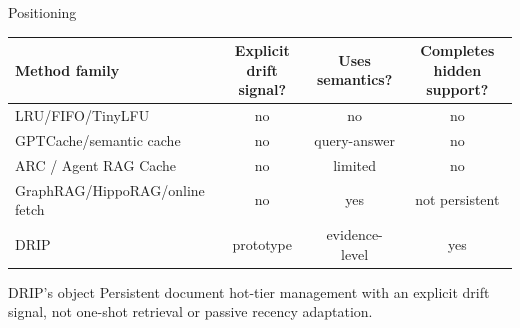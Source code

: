 \documentclass[aspectratio=169,10pt]{beamer}
\newcommand{\en}[1]{{\latinfont #1}}
\newcommand{\dive}{\en{DRIP}}
\newcommand{\arc}{\en{ARC}}
\newcommand{\lru}{\en{LRU}}
\newcommand{\fifo}{\en{FIFO}}
\newcommand{\gptc}{\en{GPTCache}}
\begin{document}
\begin{frame}{Positioning}
  \scriptsize
  \begin{table}
  \centering
  \setlength{\tabcolsep}{3pt}
  \begin{tabular}{p{}ccc}
    \toprule
    Method family & Explicit drift signal? & Uses semantics? & Completes hidden support? \\
    \midrule
    \lru{}/\fifo{}/\en{TinyLFU} & no & no & no \\
    \gptc{}/semantic cache & no & query-answer & no \\
    \arc{} / Agent RAG Cache & no & limited & no \\
    \en{GraphRAG}/\en{HippoRAG}/online fetch & no & yes & not persistent \\
    \dive{} & prototype & evidence-level & yes \\
    \bottomrule
  \end{tabular}
  \end{table}

  \begin{alertblock}{\dive{}'s object}
    Persistent document hot-tier management with an explicit drift signal,
    not one-shot retrieval or passive recency adaptation.
  \end{alertblock}
\end{frame}
\end{document}
